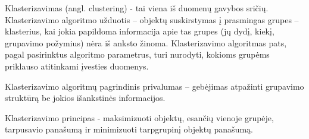 Klasterizavimas (angl.  clustering) - tai viena iš duomenų gavybos sričių. Klasterizavimo 
algoritmo užduotis – objektų suskirstymas  į prasmingas\cite{martisiute08} 
grupes – klasterius, kai jokia papildoma informacija apie tas grupes (jų dydį, kiekį, grupavimo požymius) nėra iš anksto žinoma. 
Klasterizavimo algoritmas pats, pagal pasirinktus algoritmo parametrus, turi nurodyti, kokioms 
grupėms priklauso atitinkami įvesties duomenys. 

Klasterizavimo algoritmų pagrindinis privalumas – gebėjimas atpažinti grupavimo
struktūrą be jokios išankstinės informacijos.  

Klasterizavimo principas - maksimizuoti objektų, esančių vienoje grupėje,
tarpusavio panašumą ir minimizuoti tarpgrupinį objektų panašumą.

